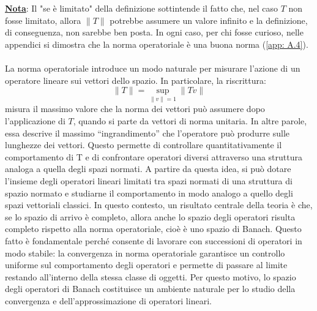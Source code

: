 \documentclass[a4paper,12pt]{report}
\begin{document}
\underline{\textbf{Nota}}: Il "se è limitato" della definizione sottintende il fatto che, nel caso $T$ non fosse limitato, allora $\|T\|$ potrebbe assumere un valore infinito e la definizione, di conseguenza, non sarebbe ben posta. In ogni caso, per chi fosse curioso, nelle appendici si dimostra che la norma operatoriale è una buona norma (\ref{app: A.4}).
\\
\\La norma operatoriale introduce un modo naturale per misurare l’azione di un operatore lineare sui vettori dello spazio. In particolare, la riscrittura: 
\[\|T\|=\displaystyle\sup_{\|v\|=1}\|Tv\|\]
misura il massimo valore che la norma dei vettori può assumere dopo l’applicazione di $T$, quando si parte da vettori di norma unitaria. In altre parole, essa descrive il massimo “ingrandimento” che l’operatore può produrre sulle lunghezze dei vettori. Questo permette di controllare quantitativamente il comportamento di T e di confrontare operatori diversi attraverso una struttura analoga a quella degli spazi normati. A partire da questa idea, si può dotare l’insieme degli operatori lineari limitati tra spazi normati di una struttura di spazio normato e studiarne il comportamento in modo analogo a quello degli spazi vettoriali classici. In questo contesto, un risultato centrale della teoria è che, se lo spazio di arrivo è completo, allora anche lo spazio degli operatori risulta completo rispetto alla norma operatoriale, cioè è uno spazio di Banach.
Questo fatto è fondamentale perché consente di lavorare con successioni di operatori in modo stabile: la convergenza in norma operatoriale garantisce un controllo uniforme sul comportamento degli operatori e permette di passare al limite restando all’interno della stessa classe di oggetti. Per questo motivo, lo spazio degli operatori di Banach costituisce un ambiente naturale per lo studio della convergenza e dell’approssimazione di operatori lineari.

\newpage
\end{document}
